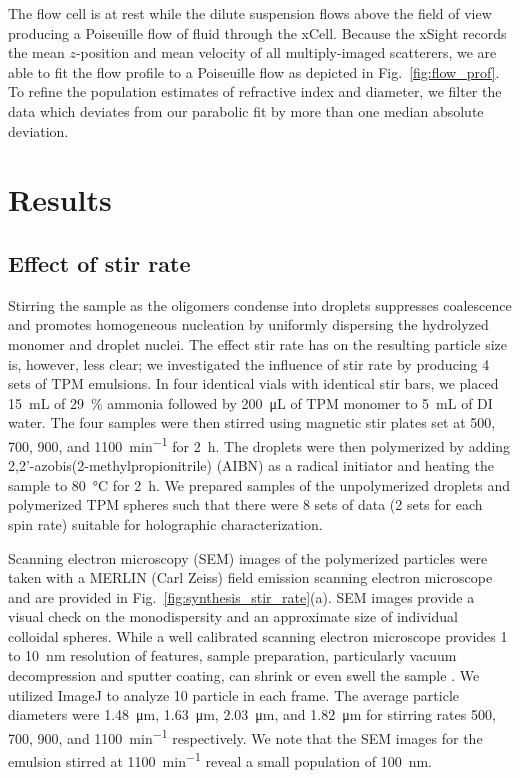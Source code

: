 The flow cell is at rest while the dilute suspension flows above
the field of view producing a Poiseuille flow of fluid through the
xCell. Because the xSight records the mean $z$-position and mean 
velocity of all multiply-imaged scatterers, we are able to fit the flow
profile to a Poiseuille flow as depicted in Fig.~\ref{fig:flow_prof}.
To refine the population estimates of refractive index and diameter, 
we filter the data which deviates from our parabolic fit by more 
than one median absolute deviation.

\section{Results}
\subsection{Effect of stir rate}

Stirring the sample as the oligomers condense into droplets suppresses coalescence and
promotes homogeneous nucleation by uniformly dispersing the hydrolyzed monomer and droplet
nuclei. %
The effect stir rate has on the resulting particle size is, however, less clear;
we investigated the influence of stir rate by producing \num{4} sets of TPM emulsions.
In four identical vials with identical stir bars, we placed \SI{15}{\milli\liter} of 
\SI{29}{\percent} ammonia followed by \SI{200}{\micro\liter} of TPM 
monomer to \SI{5}{\milli\liter} of DI water. The four samples were then stirred 
using magnetic stir plates set at \num{500}, \num{700}, \num{900}, and
\SI{1100}{\minute^{-1}} for \SI{2}{\hour}. %
The droplets were then polymerized by adding
\num{2},\num{2}'-azobis(\num{2}-methylpropionitrile) (AIBN) as a radical initiator and 
heating the sample to \SI{80}{\celsius} for \SI{2}{\hour}.
We prepared samples of the unpolymerized droplets and polymerized TPM spheres such that
there were \num{8} sets of data (\num{2} sets for each spin rate) suitable for holographic
characterization.

Scanning electron microscopy (SEM) images of the polymerized particles were taken with a
MERLIN (Carl Zeiss) field emission scanning electron microscope and are provided in
Fig.~\ref{fig:synthesis_stir_rate}(a). SEM images provide a visual check on the monodispersity
and an approximate size of individual colloidal spheres. While a well calibrated scanning
electron microscope provides \num{1} to \SI{10}{\nm} resolution of features, sample
preparation, particularly vacuum decompression and sputter coating, can shrink or
even swell the sample \cite{yamada85,jung02}. We utilized ImageJ to analyze \num{10}
particle in each frame. The average particle diameters were \SI{1.48}{\um}, \SI{1.63}{\um},
\SI{2.03}{\um}, and \SI{1.82}{\um} for stirring rates \num{500}, \num{700}, \num{900}, and
\SI{1100}{\minute^{-1}} respectively. We note that the SEM images for the emulsion
stirred at \SI{1100}{\minute^{-1}} reveal a small population of \SI{100}{\nm}.

